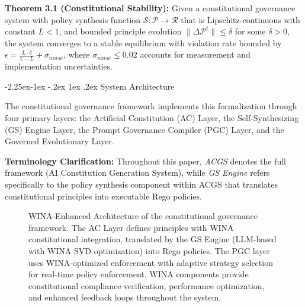 \documentclass[manuscript,screen,review,anonymous,9pt]{acmart}
\makeatletter
\renewcommand\subsection{\@startsection{subsection}{2}{\z@}%
  {-2.25ex\@plus -1ex \@minus -.2ex}%
  {1ex \@plus .2ex}%
  {\normalfont\large\bfseries}}
\makeatother
\begin{document}
\textbf{Theorem 3.1 (Constitutional Stability):} Given a constitutional governance system with policy synthesis function $\mathcal{S}: \mathcal{P} \rightarrow \mathcal{R}$ that is Lipschitz-continuous with constant $L < 1$, and bounded principle evolution $\|\Delta \mathcal{P}^t\| \leq \delta$ for some $\delta > 0$, the system converges to a stable equilibrium with violation rate bounded by $\epsilon = \frac{L \cdot \delta}{1-L} + \sigma_{noise}$, where $\sigma_{noise} \leq 0.02$ accounts for measurement and implementation uncertainties.

\subsection{System Architecture}
\label{subsec:system_architecture}

The constitutional governance framework implements this formalization through four primary layers: the Artificial Constitution (AC) Layer, the Self-Synthesizing (GS) Engine Layer, the Prompt Governance Compiler (PGC) Layer, and the Governed Evolutionary Layer.

\textbf{Terminology Clarification:} Throughout this paper, \textit{ACGS} denotes the full framework (AI Constitution Generation System), while \textit{GS Engine} refers specifically to the policy synthesis component within ACGS that translates constitutional principles into executable Rego policies.

\begin{figure}[htbp]
  \centering
  \caption[WINA-enhanced architecture diagram]{WINA-Enhanced Architecture of the constitutional governance framework. The AC Layer defines principles with WINA constitutional integration, translated by the GS Engine (LLM-based with WINA SVD optimization) into Rego policies. The PGC layer uses WINA-optimized enforcement with adaptive strategy selection for real-time policy enforcement. WINA components provide constitutional compliance verification, performance optimization, and enhanced feedback loops throughout the system.}
  \label{fig:architecture}
\end{figure}
\end{document}
